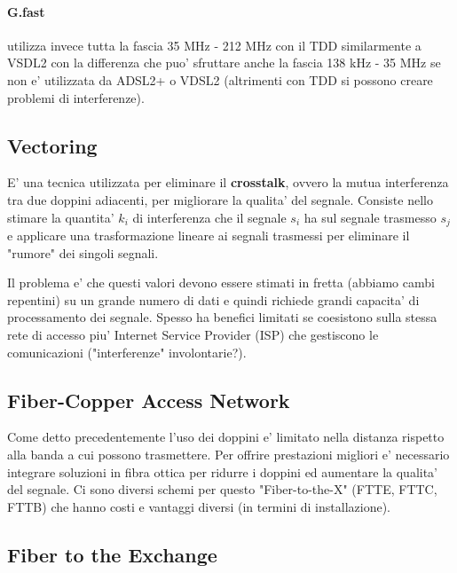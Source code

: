 \paragraph{G.fast} utilizza invece tutta la fascia 35 MHz - 212 MHz con il TDD similarmente a VSDL2 con la differenza che puo' sfruttare anche la fascia 138 kHz - 35 MHz se non e' utilizzata da ADSL2+ o VDSL2 (altrimenti con TDD si possono creare problemi di interferenze).


\subsection{Vectoring}

E' una tecnica utilizzata per eliminare il \textbf{crosstalk}, ovvero la mutua interferenza tra due doppini adiacenti, per migliorare la qualita' del segnale.
Consiste nello stimare la quantita' $k_i$ di interferenza che il segnale $s_i$ ha sul segnale trasmesso $s_j$ e applicare una trasformazione lineare ai segnali trasmessi per eliminare il "rumore" dei singoli segnali.


Il problema e' che questi valori devono essere stimati in fretta (abbiamo cambi repentini) su un grande numero di dati e quindi richiede grandi capacita' di processamento dei segnale.
Spesso ha benefici limitati se coesistono sulla stessa rete di accesso piu' Internet Service Provider (ISP) che gestiscono le comunicazioni ("interferenze" involontarie?).

\subsection{Fiber-Copper Access Network}

Come detto precedentemente l'uso dei doppini e' limitato nella distanza rispetto alla banda a cui possono trasmettere. Per offrire prestazioni migliori e' necessario integrare soluzioni in fibra ottica per ridurre i doppini ed aumentare la qualita' del segnale.
Ci sono diversi schemi per questo "Fiber-to-the-X" (FTTE, FTTC, FTTB) che hanno costi e vantaggi diversi (in termini di installazione).

\subsection{Fiber to the Exchange}

